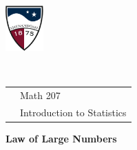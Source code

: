 \documentclass[10pt]{article}
\begin{document}
\pagestyle{empty}
\lstset{language=R, showspaces=false, showstringspaces=false}

\href{http://www.su.edu}{\includegraphics[height=1.75cm]{sulogo.eps}}
\vspace{-1.79cm}

{{\ }\hfill\small
\begin{tabular}{cl}
& Math 207\\
& Introduction to Statistics\\
\end{tabular}
}
\setlength{\baselineskip}{1.05\baselineskip}

\begin{center}
\textbf{\large Law of Large Numbers}
\end{center}
\end{document}

